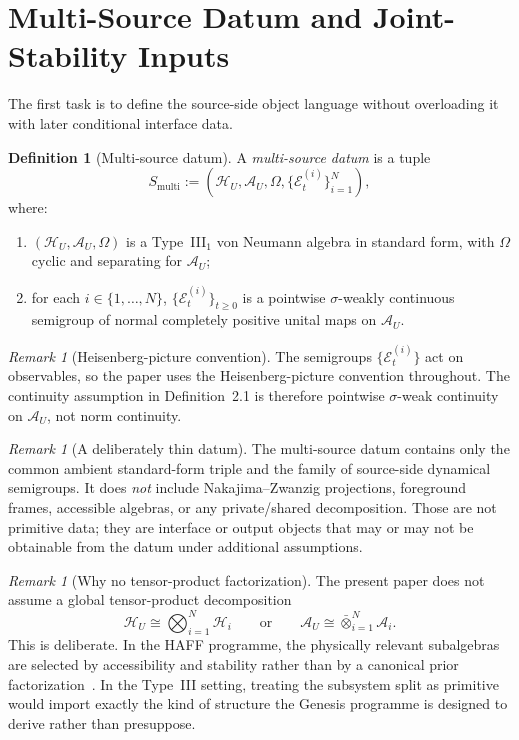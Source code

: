 \documentclass[12pt]{article}
\theoremstyle{definition}
\newtheorem{definition}[theorem]{Definition}
\theoremstyle{remark}
\newtheorem{remark}[theorem]{Remark}
\begin{document}
\section{Multi-Source Datum and Joint-Stability Inputs}\label{sec:datum}

The first task is to define the source-side object language without
overloading it with later conditional interface data.

\begin{definition}[Multi-source datum]
A \emph{multi-source datum} is a tuple
\[
S_{\mathrm{multi}}
:=
(\mathcal H_U,\mathcal A_U,\Omega,\{\mathcal E_t^{(i)}\}_{i=1}^N),
\]
where:
\begin{enumerate}
\item \((\mathcal H_U,\mathcal A_U,\Omega)\) is a Type~III\(_1\) von
  Neumann algebra in standard form, with \(\Omega\) cyclic and
  separating for \(\mathcal A_U\);
\item for each \(i\in\{1,\dots,N\}\),
  \(\{\mathcal E_t^{(i)}\}_{t\ge 0}\) is a pointwise
  \(\sigma\)-weakly continuous semigroup of normal completely positive
  unital maps on \(\mathcal A_U\).
\end{enumerate}
\end{definition}

\begin{remark}[Heisenberg-picture convention]
The semigroups \(\{\mathcal E_t^{(i)}\}\) act on observables, so the
paper uses the Heisenberg-picture convention throughout. The continuity
assumption in Definition~2.1 is therefore pointwise \(\sigma\)-weak
continuity on \(\mathcal A_U\), not norm continuity.
\end{remark}

\begin{remark}[A deliberately thin datum]
The multi-source datum contains only the common ambient standard-form
triple and the family of source-side dynamical semigroups. It does
\emph{not} include Nakajima--Zwanzig projections, foreground frames,
accessible algebras, or any private/shared decomposition. Those are not
primitive data; they are interface or output objects that may or may not
be obtainable from the datum under additional assumptions.
\end{remark}

\begin{remark}[Why no tensor-product factorization]\label{rem:notensor}
The present paper does not assume a global tensor-product decomposition
\[
\mathcal H_U \cong \bigotimes_{i=1}^N \mathcal H_i
\qquad \text{or} \qquad
\mathcal A_U \cong \bar\otimes_{i=1}^N \mathcal A_i.
\]
This is deliberate. In the HAFF programme, the physically relevant
subalgebras are selected by accessibility and stability rather than by a
canonical prior factorization~\cite{HAFFA,HAFFD}. In the Type~III
setting, treating the subsystem split as primitive would import exactly
the kind of structure the Genesis programme is designed to derive rather
than presuppose.
\end{remark}
\end{document}
